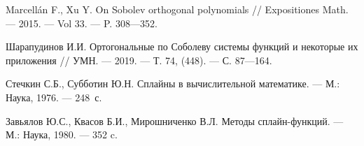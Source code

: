 \begin{thebibliography}{111}


  Marcellán F., Xu Y. 
  On Sobolev orthogonal polynomials
  //
  Expositiones Math.
  --- 2015.
  --- Vol 33.
  --- P. 308---352.

  Шарапудинов И.И. 
  Ортогональные по Соболеву системы функций и некоторые их приложения
  //
  УМН.
  --- 2019.
  --- Т. 74, (448).
  --- С. 87---164.

  Стечкин С.Б., Субботин Ю.Н.
  Сплайны в вычислительной математике.
  --- М.: Наука, 1976.
  --- 248~с.

  Завьялов Ю.С., Квасов Б.И., Мирошниченко В.Л.
  Методы сплайн-функций.
  --- М.: Наука, 1980.
  --- 352 c.

\end{thebibliography} 